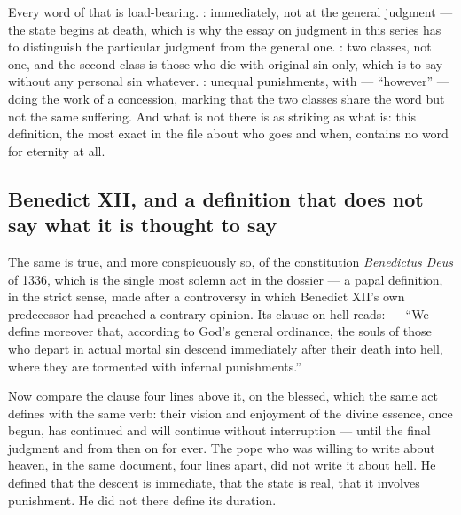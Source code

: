 Every word of that is load-bearing. : immediately, not at the general judgment --- the state begins at death, which is why the essay on judgment in this series has to distinguish the particular judgment from the general one. : two classes, not one, and the second class is those who die with original sin only, which is to say without any personal sin whatever. : unequal punishments, with  --- ``however'' --- doing the work of a concession, marking that the two classes share the word  but not the same suffering. And what is not there is as striking as what is: this definition, the most exact in the file about who goes and when, contains no word for eternity at all.

\subsection{Benedict XII, and a definition that does not say what it is thought to say}

The same is true, and more conspicuously so, of the constitution \emph{Benedictus Deus} of 1336, which is the single most solemn act in the dossier --- a papal definition, in the strict sense, made after a controversy in which Benedict XII's own predecessor had preached a contrary opinion. Its clause on hell reads:  --- ``We define moreover that, according to God's general ordinance, the souls of those who depart in actual mortal sin descend immediately after their death into hell, where they are tormented with infernal punishments.''

Now compare the clause four lines above it, on the blessed, which the same act defines with the same verb: their vision and enjoyment of the divine essence, once begun, has continued and will continue without interruption  --- until the final judgment and from then on for ever. The pope who was willing to write  about heaven, in the same document, four lines apart, did not write it about hell. He defined that the descent is immediate, that the state is real, that it involves punishment. He did not there define its duration.

